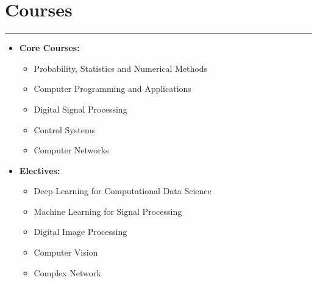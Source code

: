 \documentclass[11pt]{article}
\newlength{\sectionvspace}
\begin{document}
\section*{\bf Courses}
\vspace{\sectionvspace}
\rule{\textwidth}{0.4pt}
\begin{itemize}[leftmargin=*,noitemsep,topsep=0pt]
	\item \textbf{Core Courses:}
	\begin{itemize}[leftmargin=1em,noitemsep,topsep=0pt]
	
		
		\item Probability, Statistics and Numerical Methods
		
		\item Computer Programming and Applications
		
		\item Digital Signal Processing
		\item Control Systems
		
		\item Computer Networks
		
	\end{itemize}
	\item \textbf{Electives:} 
	\begin{itemize}[leftmargin=1em,noitemsep,topsep=0pt]
		\item Deep Learning for Computational Data Science
		
		\item Machine Learning for Signal Processing
		
		\item Digital Image Processing
		
		\item Computer Vision
		
		\item Complex Network
	\end{itemize}
	
\end{itemize}
	
\end{document}
